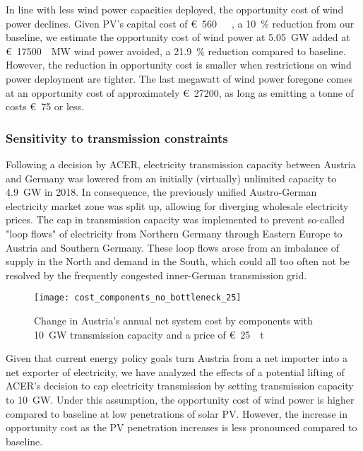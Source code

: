 \documentclass[review, 3p, times, 12pt, authoryear]{elsarticle}
\begin{document}
    In line with less wind power capacities deployed, the opportunity cost of wind power declines.
    Given PV's capital cost of \SI[per-mode=symbol,sticky-per, bracket-unit-denominator=false]{560}[\euro]{\per\kilo\wattpeak}, a \SI{10}{\percent} reduction from our baseline, we estimate the opportunity cost of wind power at \SI{5.05}{\giga\watt} added at \SI[per-mode=symbol,sticky-per, bracket-unit-denominator=false]{17500}[\euro]{\per\mega\watt} wind power avoided, a \SI{21.9}{\percent} reduction compared to baseline.
    However, the reduction in opportunity cost is smaller when restrictions on wind power deployment are tighter.
    The last megawatt of wind power foregone comes at an opportunity cost of approximately \SI{27200}[\euro]{}, as long as emitting a tonne of  costs \SI{75}[\euro]{} or less.

    \subsubsection{Sensitivity to transmission constraints} \label{subsubsec:sens_transmission}
    Following a decision by ACER, electricity transmission capacity between Austria and Germany was lowered from an initially (virtually) unlimited capacity to \SI{4.9}{\giga\watt} in 2018.
    In consequence, the previously unified Austro-German electricity market zone was split up, allowing for diverging wholesale electricity prices.
    The cap in transmission capacity was implemented to prevent so-called "loop flows" of electricity from Northern Germany through Eastern Europe to Austria and Southern Germany.
    These loop flows arose from an imbalance of supply in the North and demand in the South, which could all too often not be resolved by the frequently congested inner-German transmission grid.

    \begin{figure}[t]
        \centering
        \texttt{[image: cost\_components\_no\_bottleneck\_25]}
        \caption{Change in Austria's annual net system cost by components with \SI{10}{\giga\watt} transmission capacity and a  price of \SI[per-mode=symbol,sticky-per, bracket-unit-denominator=false]{25}[\euro]{\per\tonne}}
        \label{fig:sens_interconn_costco}
    \end{figure}

    Given that current energy policy goals turn Austria from a net importer into a net exporter of electricity, we have analyzed the effects of a potential lifting of ACER's decision to cap electricity transmission by setting transmission capacity to \SI{10}{\giga\watt}.
    Under this assumption, the opportunity cost of wind power is higher compared to baseline at low penetrations of solar PV.
    However, the increase in opportunity cost as the PV penetration increases is less pronounced compared to baseline.
\end{document}
